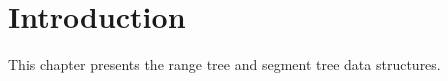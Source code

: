 \def\ccTagRmEigenClassName{\ccFalse}
\def\ccLongParamLayout{\ccTrue}

\ccThreeToTwo







\section{Introduction}

This chapter presents the {\cgal} range tree and segment tree
data structures. 








